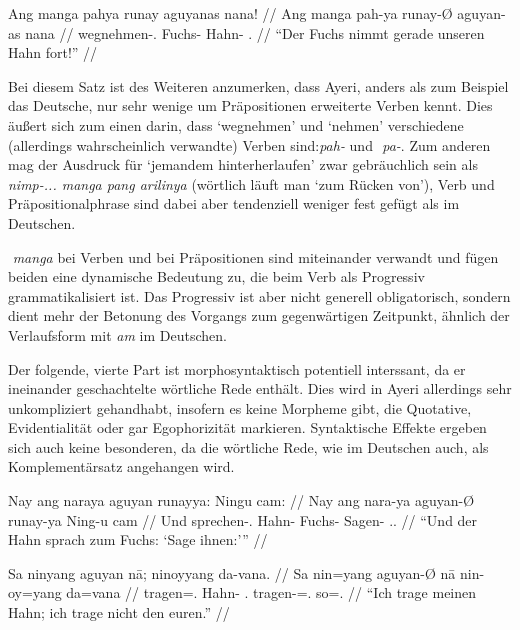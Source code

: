\documentclass[12pt,paper=a4]{scrartcl}
\newcommand{\TsgM}{{\Tsg}.{\M}}
\newcommand{\TplM}{{\Tpl}.{\M}}
\newcommand{\fw}[1]{\textit{#1}} %
\newcommand{\zwsp}{\mbox{​}} %
\newcommand{\rayr}[2]{\zwsp\smash{{\Tagati #1}} \emph{#2}} %
\begin{document}
\a\begingl
	\gla Ang manga pahya runay aguyanas nana! //
	\glb Ang manga pah-ya runay-Ø aguyan-as nana //
	\glc \AgtT{} \Prog{} wegnehmen-\TsgM{} Fuchs-\Top{} Hahn-\Parg{} \Fsg{}.\Gen{} //
	\glft \enquote{Der Fuchs nimmt gerade unseren Hahn fort!} //
\endgl

\xe

Bei diesem Satz ist des Weiteren anzumerken, dass Ayeri, anders als zum Beispiel das Deutsche, nur sehr wenige um Präpositionen erweiterte Verben kennt. Dies äußert sich zum einen darin, dass `wegnehmen' und `nehmen' verschiedene (allerdings wahrscheinlich verwandte) Verben sind: \rayr{phF/}{pah-} und \rayr{p/}{pa-}. Zum anderen mag der Ausdruck für `jemandem hinterherlaufen' zwar gebräuchlich sein als \rayr{niMpF/— mN pNF ArilinFy}{nimp-... manga pang arilinya} (wörtlich läuft man `zum Rücken von'), Verb und Präpositionalphrase sind dabei aber tendenziell weniger fest gefügt als im Deutschen.

\rayr{mN}{manga} bei Verben und bei Präpositionen sind miteinander verwandt und fügen beiden eine dynamische Bedeutung zu, die beim Verb als Progressiv grammatikalisiert ist. Das Progressiv ist aber nicht generell obligatorisch, sondern dient mehr der Betonung des Vorgangs zum gegenwärtigen Zeitpunkt, ähnlich der Verlaufsform mit \fw{am} im Deutschen.

Der folgende, vierte Part ist morphosyntaktisch potentiell interssant, da er ineinander geschachtelte wörtliche Rede enthält. Dies wird in Ayeri allerdings sehr unkompliziert gehandhabt, insofern es keine Morpheme gibt, die Quotative, Evidentialität oder gar Egophorizität markieren. Syntaktische Effekte ergeben sich auch keine besonderen, da die wörtliche Rede, wie im Deutschen auch, als Komplementärsatz angehangen wird.

\pex %
\a\begingl
	\gla Nay ang naraya aguyan runayya: Ningu cam: //
	\glb Nay ang nara-ya aguyan-Ø runay-ya Ning-u cam //
	\glc Und \AgtT{} sprechen-\TsgM{} Hahn-\Top{} Fuchs-\Loc{} Sagen-\Imp{} \TplM{}.\Dat{} //
	\glft \enquote{Und der Hahn sprach zum Fuchs: \enquote{Sage ihnen:}} //
\endgl

\a\label{ex:negativbindung}\begingl
	\gla Sa ninyang aguyan nā; ninoyyang da-vana. //
	\glb Sa nin=yang aguyan-Ø nā nin-oy=yang da=vana //
	\glc \PatT{} tragen=\Fsg{}.\Aarg{} Hahn-\Top{} \Fsg{}.\Gen{} tragen-\Neg{}=\Fsg{}.\Aarg{} so=\Spl{}.\Gen{} //
	\glft \enquote{Ich trage meinen Hahn; ich trage nicht den euren.} //
\endgl

\xe
\end{document}
